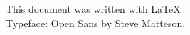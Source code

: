 \documentclass[xcolor=dvipsnames]{article}
\begin{document}
\newpage




\vfill
\begin{center}
This document was written with \LaTeX 
\\Typeface: Open Sans by Steve Matteson.
\end{center}

\end{document}
